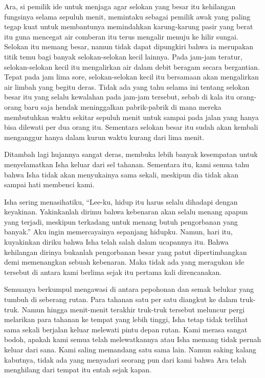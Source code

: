\documentclass[smalldemyvopaper,11pt,twoside,onecolumn,openright,extrafontsizes]{memoir}
\begin{document}
Ara, si pemilik ide untuk menjaga agar selokan yang besar itu kehilangan fungsinya selama sepuluh menit, memintaku sebagai pemilik awak yang paling tegap kuat untuk membantunya memindahkan karung-karung pasir yang berat itu guna mencegat air comberan itu terus mengalir menuju ke hilir sungai. Selokan itu memang besar, namun tidak dapat dipungkiri bahwa ia merupakan titik temu bagi banyak selokan-selokan kecil lainnya. Pada jam-jam teratur, selokan-selokan kecil itu mengalirkan air dalam debit beragam secara bergantian. Tepat pada jam lima sore, selokan-selokan kecil itu bersamaan akan mengalirkan air limbah yang begitu deras. Tidak ada yang tahu selama ini tentang selokan besar itu yang selalu kewalahan pada jam-jam tersebut, sebab di kala itu orang-orang baru saja hendak meninggalkan pabrik-pabrik di mana mereka membutuhkan waktu sekitar sepuluh menit untuk sampai pada jalan yang hanya bisa dilewati per dua orang itu. Sementara selokan besar itu sudah akan kembali menganggur hanya dalam kurun waktu kurang dari lima menit.

Ditambah lagi hujannya sangat deras, membuka lebih banyak kesempatan untuk menyelamatkan Isha keluar dari sel tahanan. Sementara itu, kami semua tahu bahwa Isha tidak akan menyukainya sama sekali, meskipun dia tidak akan sampai hati membenci kami.


Isha sering menasihatiku, ``Lee-ku, hidup itu harus selalu dihadapi dengan keyakinan. Yakinkanlah dirimu bahwa kebenaran akan selalu menang apapun yang terjadi, meskipun terkadang untuk menang butuh pengorbanan yang banyak.'' Aku ingin memercayainya sepanjang hidupku. Namun, hari itu, kuyakinkan diriku bahwa Isha telah salah dalam ucapannya itu. Bahwa kehilangan dirinya bukanlah pengorbanan besar yang patut dipertimbangkan demi memenangkan sebuah kebenaran. Maka tidak ada yang meragukan ide tersebut di antara kami berlima sejak itu pertama kali direncanakan.

Semuanya berkumpul mengawasi di antara pepohonan dan semak belukar yang tumbuh di seberang rutan. Para tahanan satu per satu diangkut ke dalam truk-truk. Namun hingga menit-menit terakhir truk-truk tersebut meluncur pergi melarikan para tahanan ke tempat yang lebih tinggi, Isha tetap tidak terlihat sama sekali berjalan keluar melewati pintu depan rutan. Kami merasa sangat bodoh, apakah kami semua telah melewatkannya atau Isha memang tidak pernah keluar dari sana. Kami saling memandang satu sama lain. Namun saking kalang kabutnya, tidak ada yang menyadari seorang pun dari kami bahwa Ara telah menghilang dari tempat itu entah sejak kapan.
\end{document}
